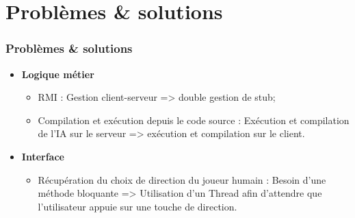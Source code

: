 \section{Problèmes \& solutions}

    \begin{frame}
        \frametitle{Problèmes \& solutions}

        \begin{itemize} 
		 \item \textbf{Logique métier}
		 	\begin{itemize}
		 		\item RMI : Gestion client-serveur => double gestion de stub;
		 		\item Compilation et exécution depuis le code source : Exécution et compilation de l'IA sur le serveur => exécution et compilation sur le client.
		 	\end{itemize}
		\item \textbf{Interface}
			\begin{itemize}
				\item Récupération du choix de direction du joueur humain : Besoin d'une méthode bloquante => Utilisation d'un Thread afin d'attendre que l'utilisateur appuie sur une touche de direction.
			\end{itemize}
		\end{itemize}
    \end{frame}
